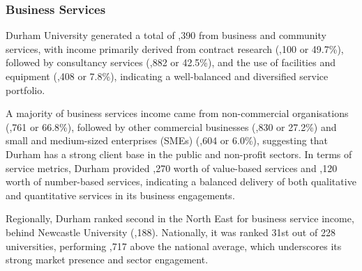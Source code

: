 \documentclass[journal,onecolumn, 10pt,draftclsnofoot]{IEEEtran}
\begin{document}
\subsubsection{Business Services}

Durham University generated a total of ,390 from business and community services, with income primarily derived from contract research (,100 or 49.7\%), followed by consultancy services (,882 or 42.5\%), and the use of facilities and equipment (,408 or 7.8\%), indicating a well-balanced and diversified service portfolio.

A majority of business services income came from non-commercial organisations (,761 or 66.8\%), followed by other commercial businesses (,830 or 27.2\%) and small and medium-sized enterprises (SMEs) (,604 or 6.0\%), suggesting that Durham has a strong client base in the public and non-profit sectors. In terms of service metrics, Durham provided ,270 worth of value-based services and ,120 worth of number-based services, indicating a balanced delivery of both qualitative and quantitative services in its business engagements.

Regionally, Durham ranked second in the North East for business service income, behind Newcastle University (,188). Nationally, it was ranked 31st out of 228 universities, performing ,717 above the national average, which underscores its strong market presence and sector engagement.
\end{document}
